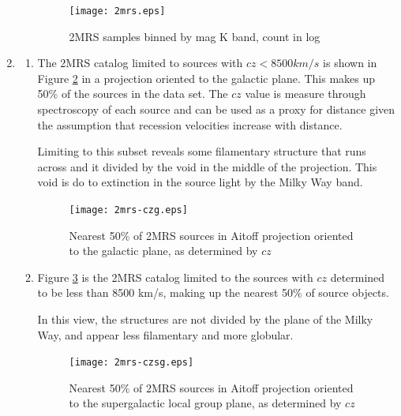 \documentclass{paper}
\begin{document}
\begin{enumerate}
\begin{enumerate}
        \begin{figure}[!htb]
          \texttt{[image: 2mrs.eps]}
          \caption{2MRS samples binned by mag K band, count in log}
          \label{fig:2mrs-bins}
        \end{figure}

    \end{enumerate}
  \pagebreak \item %
    \begin{enumerate}
      \item
        The 2MRS catalog limited to sources with $cz < 8500 km/s$ is shown in
        Figure \ref{fig:2mrs-czg} in a projection oriented to the galactic
        plane. This makes up 50\% of the sources in the data set. The 
        $cz$ value is measure through spectroscopy of each source and can be
        used as a proxy for distance given the assumption that recession
        velocities increase with distance.

        Limiting to this subset reveals some filamentary structure that runs 
        across and it divided by the void in the middle of the projection. 
        This void is do to extinction in the source light by the Milky Way 
        band.

        \begin{figure}[!htb]
          \texttt{[image: 2mrs-czg.eps]}
          \caption{Nearest 50\% of 2MRS sources in Aitoff projection 
            oriented to the galactic plane, as determined by $cz$}
          \label{fig:2mrs-czg}
        \end{figure}
    
      \item
        Figure \ref{fig:2mrs-czsg} is the 2MRS catalog limited to the sources 
        with $cz$ determined to be less than 8500 km/s, making up the nearest
        50\% of source objects. 

        In this view, the structures are not divided by the plane of the
        Milky Way, and appear less filamentary and more globular.
        \begin{figure}[!htb]
          \texttt{[image: 2mrs-czsg.eps]}
          \caption{Nearest 50\% of 2MRS sources in Aitoff projection 
            oriented to the supergalactic local group plane, as determined 
            by $cz$}
          \label{fig:2mrs-czsg}
        \end{figure}
    \end{enumerate}
\end{enumerate}

\pagebreak


\end{document}
